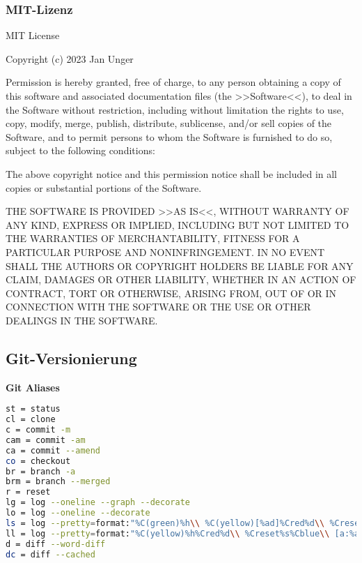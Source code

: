 \documentclass{vorlage-design-main}
\begin{document}
\hypertarget{mit-lizenz}{%
\subsubsection{MIT-Lizenz}\label{mit-lizenz}}

MIT License

Copyright (c) 2023 Jan Unger

Permission is hereby granted, free of charge, to any person obtaining a
copy of this software and associated documentation files (the
>>Software<<), to deal in the Software without restriction, including
without limitation the rights to use, copy, modify, merge, publish,
distribute, sublicense, and/or sell copies of the Software, and to
permit persons to whom the Software is furnished to do so, subject to
the following conditions:

The above copyright notice and this permission notice shall be included
in all copies or substantial portions of the Software.

THE SOFTWARE IS PROVIDED >>AS IS<<, WITHOUT WARRANTY OF ANY KIND,
EXPRESS OR IMPLIED, INCLUDING BUT NOT LIMITED TO THE WARRANTIES OF
MERCHANTABILITY, FITNESS FOR A PARTICULAR PURPOSE AND NONINFRINGEMENT.
IN NO EVENT SHALL THE AUTHORS OR COPYRIGHT HOLDERS BE LIABLE FOR ANY
CLAIM, DAMAGES OR OTHER LIABILITY, WHETHER IN AN ACTION OF CONTRACT,
TORT OR OTHERWISE, ARISING FROM, OUT OF OR IN CONNECTION WITH THE
SOFTWARE OR THE USE OR OTHER DEALINGS IN THE SOFTWARE.

\hypertarget{git-versionierung}{%
\subsection{Git-Versionierung}\label{git-versionierung}}

\textbf{Git Aliases}

\begin{lstlisting}[language=bash]
st = status
cl = clone
c = commit -m
cam = commit -am
ca = commit --amend
co = checkout
br = branch -a
brm = branch --merged
r = reset
lg = log --oneline --graph --decorate
lo = log --oneline --decorate
ls = log --pretty=format:"%C(green)%h\\ %C(yellow)[%ad]%Cred%d\\ %Creset%s%Cblue\\ [%an]" --decorate --date=relative
ll = log --pretty=format:"%C(yellow)%h%Cred%d\\ %Creset%s%Cblue\\ [a:%an,c:%cn]" --decorate --numstat
d = diff --word-diff
dc = diff --cached
\end{lstlisting}
\end{document}

